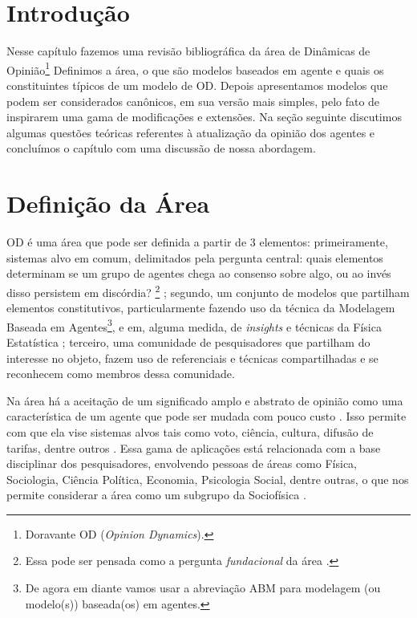 \section{Introdução}

Nesse capítulo fazemos uma revisão bibliográfica da área de Dinâmicas de
Opinião\footnote{Doravante OD (\textit{Opinion Dynamics}).} Definimos a área, o
que são modelos baseados em agente e quais os constituintes típicos de um modelo
de OD. Depois apresentamos modelos que podem ser considerados canônicos, em sua
versão mais simples, pelo fato de inspirarem uma gama de modificações e
extensões. Na seção seguinte discutimos algumas questões teóricas referentes à
atualização da opinião dos agentes e concluímos o capítulo com uma discussão de
nossa abordagem.


\section{Definição da Área}

OD é uma área que pode ser definida a partir de 3 elementos: primeiramente,
sistemas alvo em comum, delimitados pela pergunta central: quais elementos
determinam se um grupo de agentes chega ao consenso sobre algo, ou ao invés
disso persistem em discórdia? \cite{castellano2012social}\footnote{Essa pode ser
  pensada como a pergunta \textit{fundacional} da área \cite{flache2017}.} ;
segundo, um conjunto de modelos que partilham elementos constitutivos,
particularmente fazendo uso da técnica da Modelagem Baseada em
Agentes\footnote{De agora em diante vamos usar a abreviação ABM para modelagem
  (ou modelo(s)) baseada(os) em agentes.}, e em, alguma medida, de
\textit{insights} e técnicas da Física Estatística \cite{galam1990social};
terceiro, uma comunidade de pesquisadores que partilham do interesse no objeto,
fazem uso de referenciais e técnicas compartilhadas e se reconhecem como membros
dessa comunidade.

Na área há a aceitação de um significado amplo e abstrato de opinião como uma
característica de um agente que pode ser mudada com pouco custo
\cite[p.312]{castellano2012social}. Isso permite com que ela vise sistemas alvos
tais como voto, ciência, cultura, difusão de tarifas, dentre outros
\cite{kowalska2013going,martins2015thou,axelrod1997dissemination,galam1990social}.
Essa gama de aplicações está relacionada com a base disciplinar dos pesquisadores,
envolvendo pessoas de áreas como Física, Sociologia, Ciência Política, Economia,
Psicologia Social, dentre outras, o que nos permite considerar a área como um
subgrupo da Sociofísica \cite{galam1982sociophysics,galam2012sociophysics}.


